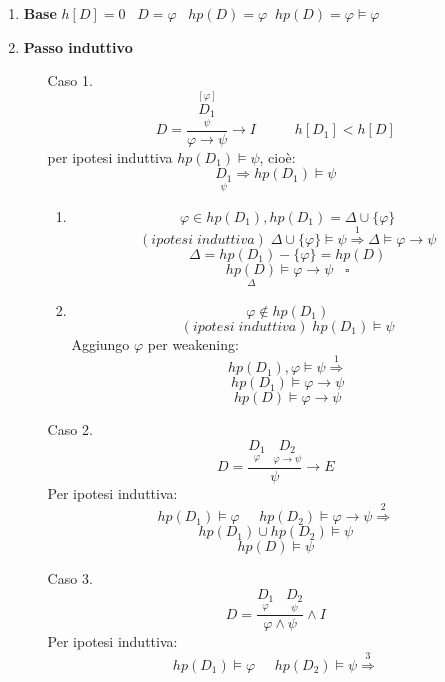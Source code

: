 \documentclass{article}
\theoremstyle{break}
\theoremstyle{break}
\theoremstyle{break}
\theoremstyle{break}
\begin{document}
\begin{enumerate}
  \item \textbf{Base} \( h[D]=0 \;\;\;D = \varphi \;\;\; hp(D) =\varphi \;\; hp(D)=\varphi \models \varphi \) 
  \item \textbf{Passo induttivo}
    \begin{enumerate}
      \item [Caso 1.]
        \[
          D = \frac{\stackrel{[\varphi]}{\underset{\psi}{D_1}}}{\varphi \to \psi} \to I \;\;\;
          \;\;\;\;\;\;\; h[D_1] < h[D]
        \]
        per ipotesi induttiva \( hp(D_1) \models \psi \), cioè:
        \[
          \underset{\psi}{D_1} \Rightarrow hp(D_1) \models \psi
        \] 
        \begin{enumerate}
          \item \[ \varphi \in  hp(D_1), hp(D_1) = \Delta \cup \{\varphi\}  \] 
            \[
              (ipotesi\;induttiva)\; \Delta \cup \{\varphi\} \models \psi \stackrel{1}{\Rightarrow} \Delta \models \varphi \to \psi 
            \] 
            \[
              \Delta = hp(D_1) - \{\varphi\} = hp(D)
            \] 
            \[
              \underset{\Delta}{hp(D)} \models \varphi \to \psi\;\;\; \square
            \] 
          \item  \[
              \varphi \not\in hp(D_1)
            \]  
            \[
              (ipotesi\;induttiva)\; hp(D_1) \models \psi
            \] 
            Aggiungo \( \varphi \) per weakening:
            \[
              hp(D_1),\varphi \models \psi \stackrel{1}{\Rightarrow}
            \] 
            \[ 
              hp(D_1) \models \varphi \to \psi
            \] 
            \[
              hp(D) \models \varphi \to \psi
            \] 
        \end{enumerate}
      \item [Caso 2.]
        \[
          D= \frac{\underset{\varphi}{D_1}\;\; \underset{\varphi \to \psi}{D_2}}{\psi} \to E
        \] 
        Per ipotesi induttiva:
        \[
          hp(D_1) \models \varphi\;\;\;\;\; hp(D_2) \models \varphi \to \psi \stackrel{2}{\Rightarrow}
        \] 
        \[
          hp(D_1) \cup hp(D_2) \models \psi
        \] 
        \[
          hp(D) \models \psi
        \] 
      \item [Caso 3.] 
        \[
          D=\frac{\underset{\varphi}{D_1}\;\;\;\underset{\psi}{D_2}}{\varphi \wedge \psi} \wedge I
        \] 
        Per ipotesi induttiva:
        \[
          hp(D_1) \models \varphi\;\;\;\;\; hp(D_2) \models \psi \stackrel{3}{\Rightarrow}
\]
\end{enumerate}
\end{enumerate}
\end{document}
